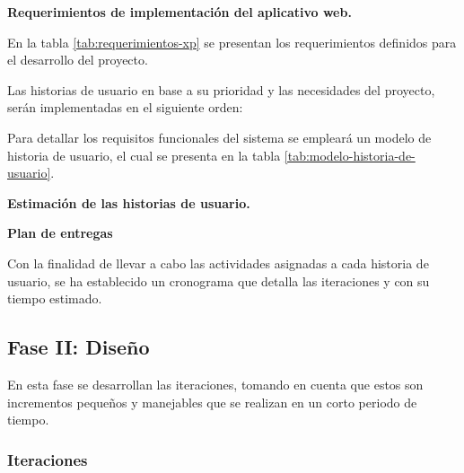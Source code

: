 % 

\textbf{Requerimientos de implementación del aplicativo web.}
\bigbreak

En la tabla \ref{tab:requerimientos-xp} se presentan los requerimientos definidos para el desarrollo del proyecto.



Las historias de usuario en base a su prioridad y las necesidades del proyecto, serán implementadas en el siguiente orden:



Para detallar los requisitos funcionales del sistema se empleará un modelo de historia de usuario, el cual se presenta en la
tabla \ref{tab:modelo-historia-de-usuario}.





\begin{landscape}
      \textbf{Estimación de las historias de usuario.}
      \bigbreak

      
\end{landscape}

\textbf{Plan de entregas}
\bigbreak

Con la finalidad de llevar a cabo las actividades asignadas a cada historia de usuario, se ha establecido un cronograma
que detalla las iteraciones y con su tiempo estimado.



\subsection{Fase II: Diseño}

En esta fase se desarrollan las iteraciones, tomando en cuenta que estos son incrementos pequeños y manejables
que se realizan en un corto periodo de tiempo.

\subsubsection{Iteraciones}

